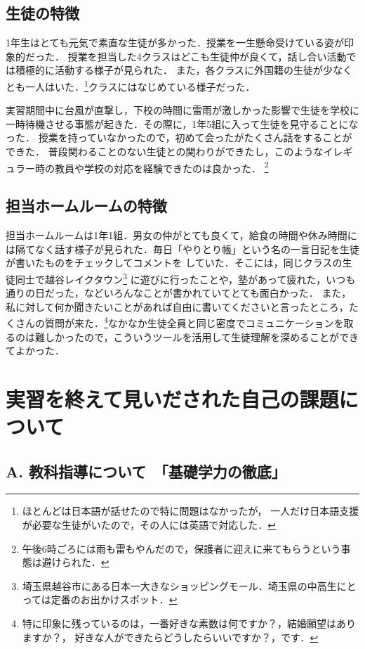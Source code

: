\documentclass{jlreq}
\begin{document}
\subsection{生徒の特徴}
1年生はとても元気で素直な生徒が多かった．授業を一生懸命受けている姿が印象的だった．
授業を担当した4クラスはどこも生徒仲が良くて，話し合い活動では積極的に活動する様子が見られた．
また，各クラスに外国籍の生徒が少なくとも一人はいた．\footnote{ほとんどは日本語が話せたので特に問題はなかったが，
一人だけ日本語支援が必要な生徒がいたので，その人には英語で対応した．}クラスにはなじめている様子だった．\par
実習期間中に台風が直撃し，下校の時間に雷雨が激しかった影響で生徒を学校に一時待機させる事態が起きた．その際に，1年5組に入って生徒を見守ることになった．
授業を持っていなかったので，初めて会ったがたくさん話をすることができた．
普段関わることのない生徒との関わりができたし，このようなイレギュラー時の教員や学校の対応を経験できたのは良かった．
\footnote{午後6時ごろには雨も雷もやんだので，保護者に迎えに来てもらうという事態は避けられた．}

\subsection{担当ホームルームの特徴}
担当ホームルームは1年1組．男女の仲がとても良くて，給食の時間や休み時間には隔てなく話す様子が見られた．毎日「やりとり帳」という名の一言日記を生徒が書いたものをチェックしてコメントを
していた．そこには，同じクラスの生徒同士で越谷レイクタウン\footnote{埼玉県越谷市にある日本一大きなショッピングモール．埼玉県の中高生にとっては定番のお出かけスポット．}
に遊びに行ったことや，塾があって疲れた，いつも通りの日だった，などいろんなことが書かれていてとても面白かった．
また，私に対して何か聞きたいことがあれば自由に書いてくださいと言ったところ，たくさんの質問が来た．\footnote{特に印象に残っているのは，一番好きな素数は何ですか？，結婚願望はありますか？，
好きな人ができたらどうしたらいいですか？，です．}なかなか生徒全員と同じ密度でコミュニケーションを取るのは難しかったので，こういうツールを活用して生徒理解を深めることができてよかった．

\newpage

\section{実習を終えて見いだされた自己の課題について}

\subsection*{A. 教科指導について　「基礎学力の徹底」}
\end{document}
